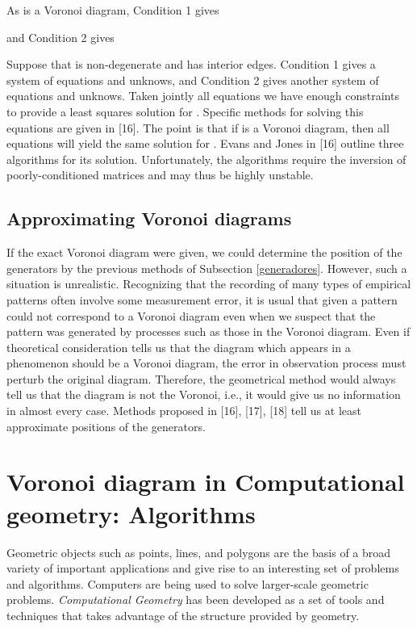 \documentclass[a4paper,12pt]{article}
\newtheorem*{Condition 1}{Condition 1}
\newtheorem*{Condition 2}{Condition 2}
\theoremstyle{definition}
\theoremstyle{remark}
\begin{document}
 

\noindent As  is a Voronoi diagram, Condition 1 gives

and Condition 2 gives


Suppose that  is non-degenerate and has  interior edges. Condition 1 gives a system of  equations and  unknows, and Condition 2 gives another system of  equations and  unknows. Taken jointly all equations we have enough constraints to provide a least squares solution for . Specific methods for solving this equations are given in [16]. The point is that if  is a Voronoi diagram, then all equations will yield the same solution for . Evans and Jones in [16] outline three algorithms for its solution. Unfortunately, the algorithms require the inversion of
poorly-conditioned matrices and may thus be highly unstable.


\subsection{Approximating Voronoi diagrams}

If the exact Voronoi diagram were given, we could determine the position of the generators by the previous methods of Subsection \ref{generadores}. However, such a situation is unrealistic. Recognizing that the recording of many types of empirical patterns often involve some measurement error, it is usual that given a pattern could not correspond to a Voronoi diagram even when we suspect that the pattern was generated by processes such as those in the Voronoi diagram. Even if theoretical consideration tells us that the diagram which appears in a phenomenon should be a Voronoi diagram, the error in observation process must perturb the original diagram. Therefore, the geometrical method would always tell us that the diagram is not the Voronoi, i.e., it would give us no information in almost every case. Methods proposed in [16], [17], [18]  tell us at least approximate positions of the generators.


\section{Voronoi diagram in Computational geometry: Algorithms}

Geometric objects such as points, lines, and polygons are the basis of a broad variety of important applications and give rise to an interesting set of problems and algorithms. Computers are being used to solve larger-scale geometric problems. \emph{Computational Geometry} has been developed as a set of tools and techniques that takes advantage of the structure provided by geometry.
\end{document}
